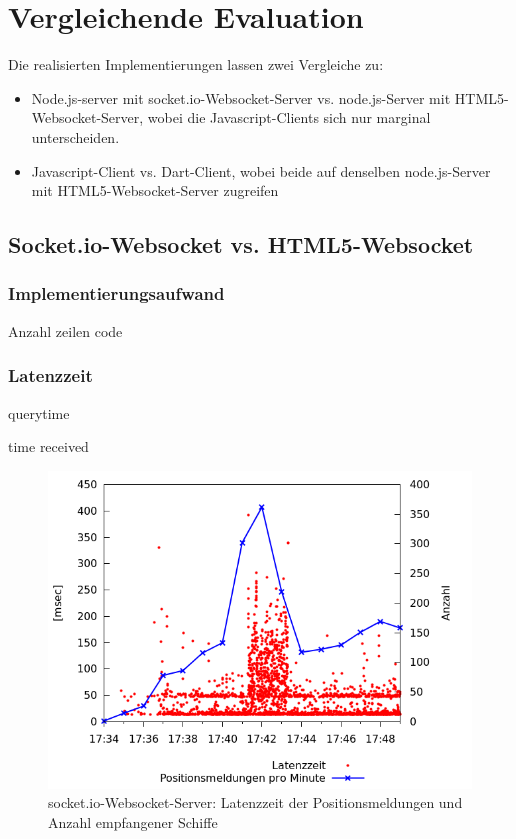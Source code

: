 \chapter{Vergleichende Evaluation}
Die realisierten Implementierungen lassen zwei Vergleiche zu: 
\begin{itemize}
\item Node.js-server mit socket.io-Websocket-Server vs. node.js-Server mit HTML5-Websocket-Server, wobei die Javascript-Clients sich nur marginal unterscheiden.
\item Javascript-Client vs. Dart-Client, wobei beide auf denselben node.js-Server mit HTML5-Websocket-Server zugreifen
\end{itemize}

\section{Socket.io-Websocket vs. HTML5-Websocket}
\subsection{Implementierungsaufwand}
Anzahl zeilen code

\subsection{Latenzzeit}
querytime

time received
\begin {figure}[H]
\begin{center}
  \includegraphics[width=4.5in]{images/latency_timeReceived_socket_io.png}
\end{center}
\caption{socket.io-Websocket-Server: Latenzzeit der Positionsmeldungen und Anzahl empfangener Schiffe}
\end {figure}

